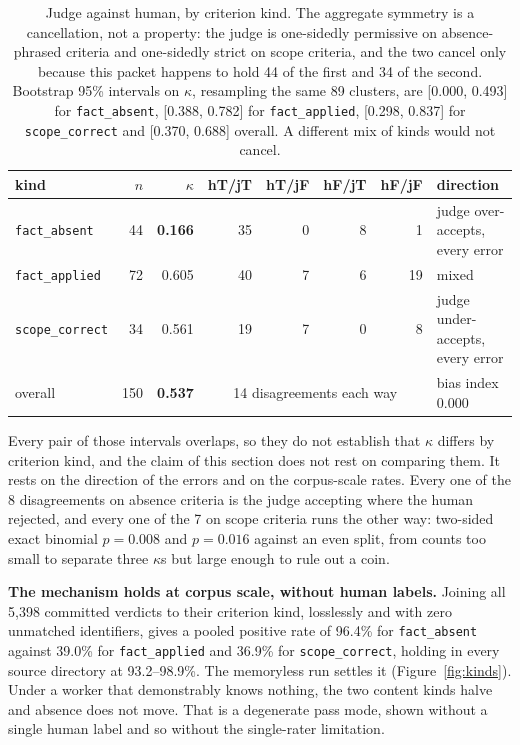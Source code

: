 \documentclass[11pt]{article}
\newcommand{\code}[1]{\texttt{\small #1}}
\begin{document}
\begin{table}[tb]
\centering
\small
\begin{tabular}{@{}l r r r r r r l@{}}
\toprule
kind & $n$ & $\kappa$ & hT/jT & hT/jF & hF/jT & hF/jF & direction\\
\midrule
\code{fact\_absent}  & 44 & \textbf{0.166} & 35 & 0 & 8 & 1 & judge over-accepts, every error\\
\code{fact\_applied} & 72 & 0.605 & 40 & 7 & 6 & 19 & mixed\\
\code{scope\_correct}& 34 & 0.561 & 19 & 7 & 0 & 8 & judge under-accepts, every error\\
\midrule
overall & 150 & \textbf{0.537} & \multicolumn{4}{c}{14 disagreements each way} & bias index 0.000\\
\bottomrule
\end{tabular}
\caption{Judge against human, by criterion kind. The aggregate symmetry is a
cancellation, not a property: the judge is one-sidedly permissive on
absence-phrased criteria and one-sidedly strict on scope criteria, and the two
cancel only because this packet happens to hold 44 of the first and 34 of the
second. Bootstrap 95\% intervals on $\kappa$, resampling the same 89 clusters,
are [0.000, 0.493] for \code{fact\_absent}, [0.388, 0.782] for
\code{fact\_applied}, [0.298, 0.837] for \code{scope\_correct} and [0.370,
0.688] overall. A different mix of kinds would not cancel.}
\label{tab:kinds}
\end{table}

Every pair of those intervals overlaps, so they do not establish that $\kappa$
differs by criterion kind, and the claim of this section does not rest on
comparing them. It rests on the direction of the errors and on the
corpus-scale rates. Every one of the 8 disagreements on absence criteria is
the judge accepting where the human rejected, and every one of the 7 on scope
criteria runs the other way: two-sided exact binomial $p = 0.008$ and $p =
0.016$ against an even split, from counts too small to separate three $\kappa$s
but large enough to rule out a coin.

\textbf{The mechanism holds at corpus scale, without human labels.} Joining
all 5,398 committed verdicts to their criterion kind, losslessly and with zero
unmatched identifiers, gives a pooled positive rate of 96.4\% for
\code{fact\_absent} against 39.0\% for \code{fact\_applied} and 36.9\% for
\code{scope\_correct}, holding in every source directory at 93.2--98.9\%. The
memoryless run settles it (Figure~\ref{fig:kinds}). Under a worker that
demonstrably knows nothing, the two content kinds halve and absence does not
move. That is a degenerate pass mode, shown without a single human label and
so without the single-rater limitation.
\end{document}
